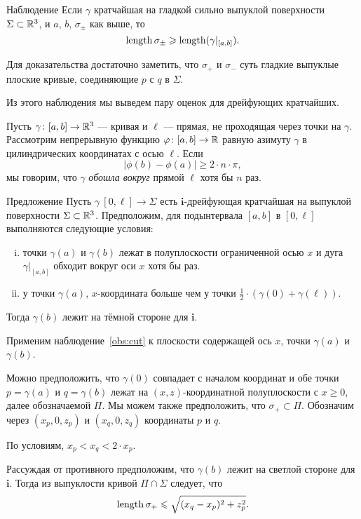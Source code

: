 \documentclass[a4paper,10pt]{article}
\begin{document}
\begin{thm}{Наблюдение}\label{obs:cut}
Если $\gamma$ кратчайшая на гладкой сильно выпуклой поверхности $\Sigma\subset \mathbb{R}^3$, и $a$, $b$, $\sigma_\pm$ как выше, то
\[\mathop{\rm length}\nolimits\sigma_\pm\geqslant\mathop{\rm length}\nolimits(\gamma|_{[a,b]}).\]
\end{thm}

Для доказательства достаточно заметить, что $\sigma_{+}$ и $\sigma_{-}$  суть гладкие выпуклые плоские кривые, 
соединяющие $p$ с $q$ в $\Sigma$.

Из этого наблюдения мы выведем пару оценок для дрейфующих кратчайших.

Пусть $\gamma\colon[a,b]\to\mathbb{R}^3$ --- кривая и $\ell$ --- прямая, не проходящая через точки на $\gamma$.
Рассмотрим непрерывную функцию $\varphi\colon[a,b]\to\mathbb{R}$ равную азимуту $\gamma$ в цилиндрических координатах с осью $\ell$.
Если
\[|\phi(b)-\phi(a)|\ge 2\cdot n\cdot\pi,\]
мы говорим, что  $\gamma$ \emph{обошла вокруг} прямой $\ell$ хотя бы $n$ раз.

\begin{thm}{Предложение}\label{prop:around-once}
Пусть $\gamma\:[0,\ell]\to \Sigma$ есть $\bm{i}$-дрейфующая кратчайшая на выпуклой поверхности $\Sigma\subset \mathbb{R}^3$. Предположим, для подынтервала $[a,b]$ в $[0,\ell]$ выполняются следующие условия:
\begin{enumerate}[(i)]
\item точки $\gamma(a)$ и $\gamma(b)$ лежат в полуплоскости ограниченной осью $x$ 
и дуга $\gamma|_{[a,b]}$ обходит вокруг оси $x$ хотя бы раз.
\item  у точки $\gamma(a)$, $x$-координата больше чем у точки $\tfrac12\cdot(\gamma(0)+\gamma(\ell))$.
\end{enumerate}
Тогда  $\gamma(b)$ лежит на тёмной стороне для $\bm{i}$.
\end{thm}

Применим наблюдение~\ref{obs:cut} к плоскости содержащей ось $x$, точки $\gamma(a)$ и $\gamma(b)$.


Можно предположить, что $\gamma(0)$ совпадает с началом координат 
и обе точки $p=\gamma(a)$ и $q=\gamma(b)$ лежат на $(x,z)$-координатной полуплоскости с $x\ge 0$, далее обозначаемой $\Pi$.
Мы можем также предположить, что $\sigma_+\subset \Pi$.
Обозначим через $(x_p,0,z_p)$ и $(x_q,0,z_q)$ координаты $p$ и $q$.

По условиям, $x_p<x_q<2\cdot x_p$.

Рассуждая от противного предположим, что $\gamma(b)$ лежит на светлой стороне для $\bm{i}$.
Тогда из выпуклости кривой $\Pi\cap \Sigma$
следует, что 
\[\mathop{\rm length}\nolimits\sigma_+\leqslant \sqrt{(x_q-x_p)^2+z_p^2}.\]
\end{document}
